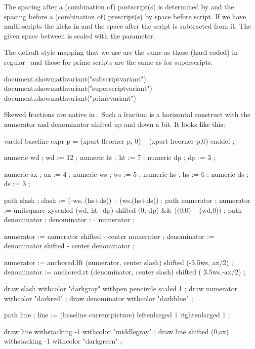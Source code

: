 The spacing after a (combination of) postscript(s) is determined by  and the spacing before a (combination of) prescript(s) by \quote
{space before script}. If we have multi-scripts the 
kicks in and the space after the script is subtracted from it. The given space
between is scaled with the \type {\scriptspacebetweenfactor} parameter.

The default style mapping that we use are the same as those (hard coded) in
regular \TEX\ and those for prime scripts are the same as for superscripts.

\startluacode
document.showmathvariant("subscriptvariant")
document.showmathvariant("superscriptvariant")
document.showmathvariant("primevariant")
\stopluacode

\stopsection

\startsection[title=Skewed fractions]

Skewed fractions are native in \LUAMETATEX. Such a fraction is a horizontal
construct with the numerator and denominator shifted up and down a bit. It looks
like this:

\startlinecorrection
\startMPcode
    vardef baseline expr p =
        (xpart llcorner p, 0) -- (xpart lrcorner p,0)
    enddef ;

    numeric wd ; wd := 12 ;
    numeric ht ; ht :=  7 ;
    numeric dp ; dp :=  3 ;

    numeric ax ; ax :=  4 ;
    numeric ws ; ws :=  5 ;
    numeric hs ; hs :=  6 ;
    numeric ds ; ds :=  3 ;

    path slash       ; slash       := (-ws,-(hs+ds)) -- (ws,(hs+ds))  ;
    path numerator   ; numerator   := unitsquare xyscaled (wd, ht+dp) shifted (0,-dp) && ((0,0) -- (wd,0)) ;
    path denominator ; denominator := numerator ;

    numerator   := numerator   shifted - center numerator ;
    denominator := denominator shifted - center denominator ;

    numerator   := anchored.lft (numerator,   center slash) shifted (-3.5ws, ax/2) ;
    denominator := anchored.rt  (denominator, center slash) shifted ( 3.5ws,-ax/2) ;

    draw slash       withcolor "darkgray" withpen pencircle scaled 1 ;
    draw numerator   withcolor "darkred"  ;
    draw denominator withcolor "darkblue" ;

    path line ; line := (baseline currentpicture) leftenlarged 1 rightenlarged 1 ;

    draw line                withstacking -1 withcolor "middlegray" ;
    draw line shifted (0,ax) withstacking -1 withcolor "darkgreen"  ; %

